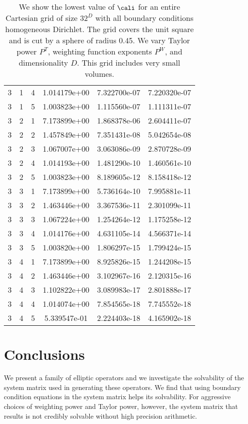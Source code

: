 \documentclass{article}
\begin{document}
{\begin{small}
\begin{table}
\begin{center}
\begin{tabular}{|ccc|ccc|}
3 & 1 & 4 & 1.014179e+00 & 7.322700e-07 & 7.220320e-07 \\ 
3 & 1 & 5 & 1.003823e+00 & 1.115560e-07 & 1.111311e-07 \\ 
3 & 2 & 1 & 7.173899e+00 & 1.868378e-06 & 2.604411e-07 \\ 
3 & 2 & 2 & 1.457849e+00 & 7.351431e-08 & 5.042654e-08 \\ 
3 & 2 & 3 & 1.067007e+00 & 3.063086e-09 & 2.870728e-09 \\ 
3 & 2 & 4 & 1.014193e+00 & 1.481290e-10 & 1.460561e-10 \\ 
3 & 2 & 5 & 1.003823e+00 & 8.189605e-12 & 8.158418e-12 \\ 
3 & 3 & 1 & 7.173899e+00 & 5.736164e-10 & 7.995881e-11 \\ 
3 & 3 & 2 & 1.463446e+00 & 3.367536e-11 & 2.301099e-11 \\ 
3 & 3 & 3 & 1.067224e+00 & 1.254264e-12 & 1.175258e-12 \\ 
3 & 3 & 4 & 1.014176e+00 & 4.631105e-14 & 4.566371e-14 \\ 
3 & 3 & 5 & 1.003820e+00 & 1.806297e-15 & 1.799424e-15 \\ 
3 & 4 & 1 & 7.173899e+00 & 8.925826e-15 & 1.244208e-15 \\ 
3 & 4 & 2 & 1.463446e+00 & 3.102967e-16 & 2.120315e-16 \\ 
3 & 4 & 3 & 1.102822e+00 & 3.089983e-17 & 2.801888e-17 \\ 
3 & 4 & 4 & 1.014074e+00 & 7.854565e-18 & 7.745552e-18 \\ 
3 & 4 & 5 & 5.339547e-01 & 2.224403e-18 & 4.165902e-18 \\ 
\hline
\end{tabular}
\end{center}
\label{fig::unmergedDiri}
\caption
    {
      We show the lowest value of
      $\cali$ for an entire Cartesian grid of size $32^D$ with all
      boundary conditions homogeneous Dirichlet.
      The grid covers the unit square and is cut by a sphere of radius 0.45.
      We vary Taylor power $P^T$, weighting
      function exponents $P^W$, and dimensionality $D$.    This grid
      includes very small volumes.
    }
\end{table}
\end{small}


\section{Conclusions}

We present a family of elliptic operators and we investigate the
solvability of the system matrix used in generating these operators.
We find that using boundary condition equations in the system matrix
helps its solvability.   For aggressive choices of weighting power and
Taylor power, however, the system matrix that results is not credibly
solvable without high precision arithmetic.



}
\end{document}

